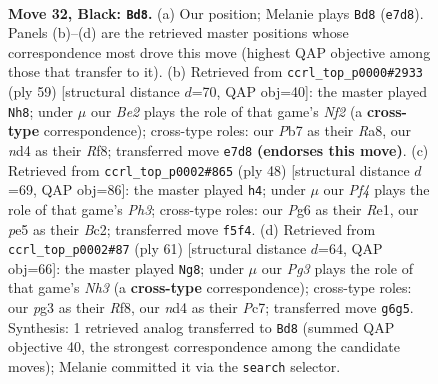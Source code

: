 \documentclass[11pt]{article}
\begin{document}
\clearpage

\begin{figure}[p]\centering
\begin{subfigure}{0.46\textwidth}\centering
\resizebox{\linewidth}{!}{%
\newchessgame
\chessboard[
  setfen={r5r1/1p1kbb1p/n5pP/p2pPp2/P2N4/2N3P1/1B4K1/R4R2 b - - 8 32},
  showmover=false,
  pgfstyle=straightmove, color=movearrow, markmove={e7-d8}
]}
\caption{}
\end{subfigure}\hfill
\begin{subfigure}{0.46\textwidth}\centering
\resizebox{\linewidth}{!}{%
\newchessgame
\chessboard[
  setfen={r4rk1/p4nb1/3p2p1/1Pp1p3/4P1RP/7K/PP1B3N/2R5 b - - 0 30},
  showmover=false,
  pgfstyle=straightmove, color=movearrow, markmove={f7-h8}
]}
\caption{}
\end{subfigure}
\\[4pt]
\begin{subfigure}{0.46\textwidth}\centering
\resizebox{\linewidth}{!}{%
\newchessgame
\chessboard[
  setfen={r3r1k1/p4p2/2pp2pp/6n1/P1bBP3/7P/2BK1PP1/1R2R3 w - - 3 25},
  showmover=false,
  pgfstyle=straightmove, color=movearrow, markmove={h3-h4}
]}
\caption{}
\end{subfigure}\hfill
\begin{subfigure}{0.46\textwidth}\centering
\resizebox{\linewidth}{!}{%
\newchessgame
\chessboard[
  setfen={2k1rr2/2p5/p1p4n/1p2Ppb1/7p/2N4P/PPP3PB/4RR1K b - - 3 31},
  showmover=false,
  pgfstyle=straightmove, color=movearrow, markmove={h6-g8}
]}
\caption{}
\end{subfigure}
\caption{\textbf{Move 32, Black: \texttt{Bd8}.} (a) Our position; Melanie plays \texttt{Bd8} (\texttt{e7d8}). Panels (b)--(d) are the retrieved master positions whose correspondence most drove this move (highest QAP objective among those that transfer to it). (b) Retrieved from \texttt{ccrl\_top\_p0000\#2933} (ply 59) [structural distance $d$=70, QAP obj=40]: the master played \texttt{Nh8}; under $\mu$ our \emph{Be2} plays the role of that game's \emph{Nf2} (a \textbf{cross-type} correspondence); cross-type roles: our \emph{P}b7 as their \emph{R}a8, our \emph{n}d4 as their \emph{R}f8; transferred move \texttt{e7d8} \textbf{(endorses this move)}. (c) Retrieved from \texttt{ccrl\_top\_p0002\#865} (ply 48) [structural distance $d$=69, QAP obj=86]: the master played \texttt{h4}; under $\mu$ our \emph{Pf4} plays the role of that game's \emph{Ph3}; cross-type roles: our \emph{P}g6 as their \emph{R}e1, our \emph{p}e5 as their \emph{B}c2; transferred move \texttt{f5f4}. (d) Retrieved from \texttt{ccrl\_top\_p0002\#87} (ply 61) [structural distance $d$=64, QAP obj=66]: the master played \texttt{Ng8}; under $\mu$ our \emph{Pg3} plays the role of that game's \emph{Nh3} (a \textbf{cross-type} correspondence); cross-type roles: our \emph{p}g3 as their \emph{R}f8, our \emph{n}d4 as their \emph{P}c7; transferred move \texttt{g6g5}. Synthesis: 1 retrieved analog transferred to \texttt{Bd8} (summed QAP objective 40, the strongest correspondence among the candidate moves); Melanie committed it via the \texttt{search} selector.}
\label{fig:thought-m63}
\end{figure}
\end{document}
